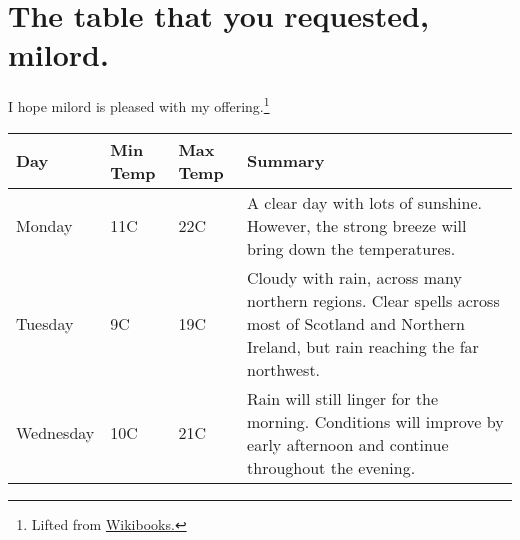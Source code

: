 \documentclass{article}
\begin{document}
\section{The table that you requested, milord.}
I hope milord is pleased with my offering.\footnote{Lifted from \href{http://en.wikibooks.org/wiki/LaTeX/Tables}{Wikibooks.}}

\begin{tabular}{ | l | l | l | p{5cm} |}
    \hline
    Day & Min Temp & Max Temp & Summary \\ \hline
    Monday & 11C & 22C & A clear day with lots of sunshine.  
    However, the strong breeze will bring down the temperatures. \\ \hline
    Tuesday & 9C & 19C & Cloudy with rain, across many northern regions. Clear spells
    across most of Scotland and Northern Ireland,
    but rain reaching the far northwest. \\ \hline
    Wednesday & 10C & 21C & Rain will still linger for the morning.
    Conditions will improve by early afternoon and continue
    throughout the evening. \\
    \hline
\end{tabular}



\newpage

\printglossary[title={List of Symbols},toctitle={List of Symbols}]
\printglossary[type=\acronymtype] 
\end{document}
